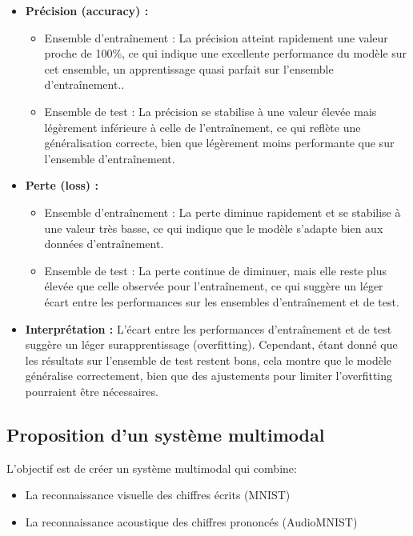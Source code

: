 \documentclass{article}
\begin{document}
\begin{itemize}
    \item \textbf{Précision (accuracy) :}
    \begin{itemize}
        \item Ensemble d'entraînement : La précision atteint rapidement une valeur proche de 100\%, ce qui indique une excellente performance du modèle sur cet ensemble, un apprentissage quasi parfait sur l'ensemble d'entraînement..
        \item Ensemble de test : La précision se stabilise à une valeur élevée mais légèrement inférieure à celle de l'entraînement, ce qui reflète une généralisation correcte, bien que légèrement moins performante que sur l'ensemble d'entraînement.
    \end{itemize}
    
    \item \textbf{Perte (loss) :}
    \begin{itemize}
        \item Ensemble d'entraînement : La perte diminue rapidement et se stabilise à une valeur très basse, ce qui indique que le modèle s'adapte bien aux données d'entraînement.
        \item Ensemble de test : La perte continue de diminuer, mais elle reste plus élevée que celle observée pour l'entraînement, ce qui suggère un léger écart entre les performances sur les ensembles d'entraînement et de test. 
    \end{itemize}
    
    \item \textbf{Interprétation :} L'écart entre les performances d'entraînement et de test suggère un léger surapprentissage (overfitting). Cependant, étant donné que les résultats sur l'ensemble de test restent bons, cela montre que le modèle généralise correctement, bien que des ajustements pour limiter l'overfitting pourraient être nécessaires.
\end{itemize}


\subsection{Proposition d'un système multimodal}
\label{sec:multimodal}

L'objectif est de créer un système multimodal qui combine:
\begin{itemize}
    \item La reconnaissance visuelle des chiffres écrits (MNIST)
    \item La reconnaissance acoustique des chiffres prononcés (AudioMNIST)
\end{itemize}
\end{document}
